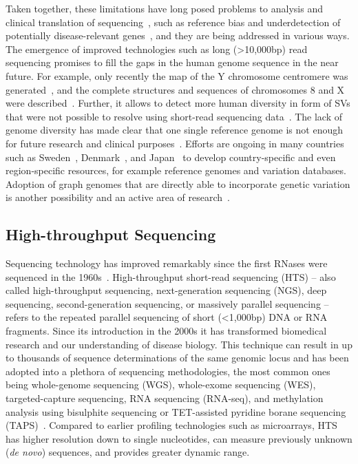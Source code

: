 \documentclass[11pt]{book}
\begin{document}
Taken together, these limitations have long posed problems to analysis and clinical translation of sequencing~\cite{Rosenfeld:2012, Yang:2019-refgenome}, such as reference bias and underdetection of potentially disease-relevant genes~\cite{Ebbert:2019}, and they are being addressed in various ways. The emergence of improved technologies such as long (>10,000bp) read sequencing promises to fill the gaps in the human genome sequence in the near future. For example, only recently the map of the Y chromosome centromere was generated~\cite{Jain:2018-chry}, and the complete structures and sequences of chromosomes 8 and X were described~\cite{Logsdon:2020, Miga:2020}. Further, it allows to detect more human diversity in form of SVs that were not possible to resolve using short-read sequencing data~\cite{Huddleston:2017}. The lack of genome diversity has made clear that one single reference genome is not enough for future research and clinical purposes~\cite{Yang:2019-refgenome}. Efforts are ongoing in many countries such as Sweden~\cite{Ameur:2018, Nordin:2019, Svensson:2020}, Denmark~\cite{Maretty:2017}, and Japan~\cite{Yamaguchi-Kabata:2015, Nagasaki:2019} to develop country-specific and even region-specific resources, for example reference genomes and variation databases. Adoption of graph genomes that are directly able to incorporate genetic variation is another possibility and an active area of research~\cite{Paten:2017}.


\subsection{High-throughput Sequencing}
\label{subsec:high-throughput-sequencing}

Sequencing technology has improved remarkably since the first RNases were sequenced in the 1960s~\cite{HeatherChain:2016, Shendure:2017}. High-throughput short-read sequencing (HTS) -- also called high-throughput sequencing, next-generation sequencing (NGS), deep sequencing, second-gene\-ration sequencing, or massively parallel sequencing -- refers to the repeated parallel sequencing of short (<1,000bp) DNA or RNA fragments. Since its introduction in the 2000s it has transformed biomedical research and our understanding of disease biology. This technique can result in up to thousands of sequence determinations of the same genomic locus and has been adopted into a plethora of sequencing methodologies, the most common ones being whole-genome sequencing (WGS), whole-exome sequencing (WES), targeted-capture sequencing, RNA sequencing (RNA-seq), and methylation analysis using bisulphite sequencing or TET-assisted pyridine borane sequencing (TAPS)~\cite{Yibin:2019}. Compared to earlier profiling technologies such as microarrays, HTS has higher resolution down to single nucleotides, can measure previously unknown (\textit{de novo}) sequences, and provides greater dynamic range.
\end{document}
